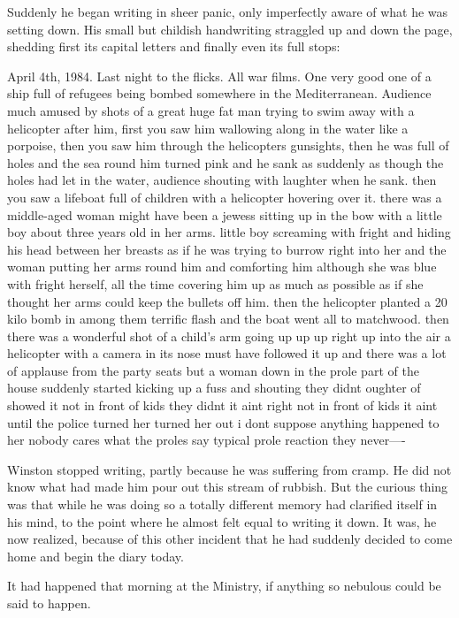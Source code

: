 \documentclass{article}
\begin{document}
Suddenly he began writing in sheer panic, only imperfectly aware of what
he was setting down. His small but childish handwriting straggled up and
down the page, shedding first its capital letters and finally even its
full stops:


   April 4th, 1984. Last night to the flicks. All war films. One very good
one of a ship full of refugees being bombed somewhere in the Mediterranean.
Audience much amused by shots of a great huge fat man trying to swim away
with a helicopter after him, first you saw him wallowing along in the
water like a porpoise, then you saw him through the helicopters gunsights,
then he was full of holes and the sea round him turned pink and he sank as
suddenly as though the holes had let in the water, audience shouting with
laughter when he sank. then you saw a lifeboat full of children with a
helicopter hovering over it. there was a middle-aged woman might have been
a jewess sitting up in the bow with a little boy about three years old in
her arms. little boy screaming with fright and hiding his head between her
breasts as if he was trying to burrow right into her and the woman putting
her arms round him and comforting him although she was blue with fright
herself, all the time covering him up as much as possible as if she thought
her arms could keep the bullets off him. then the helicopter planted a 20
kilo bomb in among them terrific flash and the boat went all to matchwood.
then there was a wonderful shot of a child's arm going up up up right up
into the air a helicopter with a camera in its nose must have followed it
up and there was a lot of applause from the party seats but a woman down in
the prole part of the house suddenly started kicking up a fuss and shouting
they didnt oughter of showed it not in front of kids they didnt it aint
right not in front of kids it aint until the police turned her turned her
out i dont suppose anything happened to her nobody cares what the proles
say typical prole reaction they never----


Winston stopped writing, partly because he was suffering from cramp. He did
not know what had made him pour out this stream of rubbish. But the curious
thing was that while he was doing so a totally different memory had
clarified itself in his mind, to the point where he almost felt equal to
writing it down. It was, he now realized, because of this other incident
that he had suddenly decided to come home and begin the diary today.

It had happened that morning at the Ministry, if anything so nebulous could
be said to happen.
\end{document}
